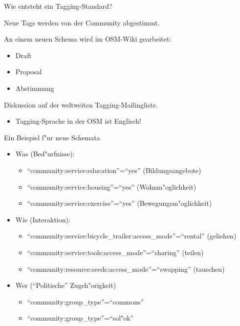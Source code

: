 \documentclass{beamer}
\begin{document}
\begin{frame}{Wie entsteht ein Tagging-Standard?}

Neue Tags werden von der Community abgestimmt.
\vspace{0.7cm}

An einem neuen Schema wird im OSM-Wiki gearbeitet:
\begin{itemize}
  \item Draft
  \item Proposal
  \item Abstimmung
\end{itemize}

Diskussion auf der weltweiten Tagging-Mailingliste.
\pause
\begin{itemize}
	  \item Tagging-Sprache in der OSM ist Englisch!
\end{itemize}

\pause

\end{frame}

\begin{frame}{Ein Beispiel f"ur neue Schemata}

\begin{itemize}
	\item Was (Bed"urfnisse):
	\begin{itemize}
		\item ``community:service:education''=``yes'' (Bildungsangebote)
		\item ``community:service:housing''=``yes'' (Wohnm"oglichkeit)
		\item ``community:service:exercise''=``yes'' (Bewegungsm"oglichkeit)
	\end{itemize}
\end{itemize}

\pause
\begin{itemize}
	\item Wie (Interaktion):
	\begin{itemize}
		\item ``community:service:bicycle\_trailer:access\_mode''=``rental'' (geliehen)
		\item ``community:service:tools:access\_mode''=``sharing'' (teilen)
		\item ``community:resource:seeds:access\_mode''=``swapping'' (tauschen)
	\end{itemize}
\end{itemize}
\pause
\begin{itemize}
	\item Wer ("`Politische"' Zugeh"origkeit)
	\begin{itemize}
		\item ``community:group\_type''=``commons'' 
		\item ``community:group\_type''=``sol"ok'' 
	\end{itemize}
\end{itemize}

\end{frame}
\end{document}
